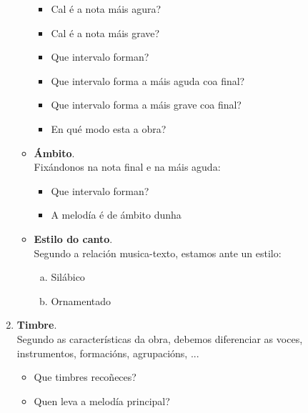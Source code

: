 \begin{multicols}{2}
\begin{enumerate}[1.-]
\begin{itemize}
\begin{itemize}
            \item
            Cal é a nota máis agura? \dotfill 
            \item
            Cal é a nota máis grave? \dotfill 
            \item
            Que intervalo forman? \dotfill
            \item
            Que intervalo forma a máis aguda coa final? \dotfill
            \item
            Que intervalo forma a máis grave coa final? \dotfill 
            \item
            En qué modo esta a obra? \dotfill
       \end{itemize}
            \item %
            \textbf{Ámbito}. \\
            Fixándonos na nota final e na máis aguda:
                \begin{itemize}
                    \item
                    Que intervalo forman? \dotfill
                    \item
                    A melodía é de ámbito dunha \dotfill
                \end{itemize}
            \item %
            \textbf{Estilo do canto}. \\ Segundo a relación musica-texto, estamos ante un estilo:
                \begin{enumerate}[a)]
                  \item
                  Silábico \dotfill
                  \item
                  Ornamentado \dotfill
                \end{enumerate}
        \end{itemize}
        \item %
        \textbf{Timbre}. \\
        Segundo as características da obra, debemos diferenciar as voces, instrumentos, formacións, agrupacións, ...
            \begin{itemize}
                \item 
                Que timbres recoñeces? \dotfill
                \item
                Quen leva a melodía principal? \dotfill
            \end{itemize}

\end{enumerate}
\end{multicols}
